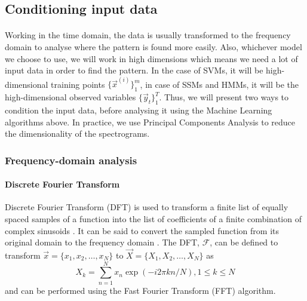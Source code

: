 \subsection{Conditioning input data}
\paragraph{}
	Working in the time domain, the data is usually transformed to the frequency domain to analyse where the pattern is found more easily. Also, whichever model we choose to use, we will work in high dimensions which means we need a lot of input data in order to find the pattern. In the case of SVMs, it will be high-dimensional training points $\{\vec x^{(i)}\}_1^m$, in case of SSMs and HMMs, it will be the high-dimensional observed variables $\{\vec y_t\}_1^T$. Thus, we will present two ways to condition the input data, before analysing it using the Machine Learning algorithms above. In practice, we use Principal Components Analysis to reduce the dimensionality of the spectrograms.
\subsubsection{Frequency-domain analysis}

\paragraph{Discrete Fourier Transform}
	Discrete Fourier Transform (DFT) is used to transform a finite list of equally spaced samples of a function into the list of coefficients of a finite combination of complex sinusoids \cite{wiki:DFT}. It can be said to convert the sampled function from its original domain to the frequency domain \cite{wiki:DFT}. The DFT, $\mathcal{F}$, can be defined to transform $\vec x = \{x_1, x_2, \dotsc, x_{N}\}$ to $\vec X = \{X_1, X_2, \dotsc, X_{N}\}$ as
	\begin{equation}
		X_k = \sum_{n = 1}^{N} x_n \exp{(-i2\pi k n / N)}, 1 \leq k \leq N
	\end{equation}
	and can be performed using the Fast Fourier Transform (FFT) algorithm.

